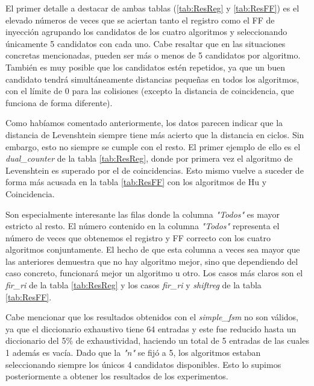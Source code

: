 El primer detalle a destacar de ambas tablas (\ref{tab:ResReg} y \ref{tab:ResFF}) 
es el elevado números de veces que se aciertan tanto el registro como el \gls{FF} 
de inyección agrupando los candidatos de los cuatro algoritmos y seleccionando 
únicamente 5 candidatos con cada uno. Cabe resaltar que en las situaciones 
concretas mencionadas, pueden ser más o menos de 5 candidatos por algoritmo. 
También es muy posible que los candidatos estén repetidos, ya que un buen 
candidato tendrá simultáneamente distancias pequeñas en todos los algoritmos, 
con el límite de 0 para las colisiones (excepto la distancia de coincidencia, 
que funciona de forma diferente).

Como habíamos comentado anteriormente, los datos parecen indicar que la distancia
de Levenshtein siempre tiene más acierto que la distancia en ciclos. Sin embargo,
esto no siempre se cumple con el resto. El primer ejemplo de ello es el
\textit{dual\_counter} de la tabla \ref{tab:ResReg}, donde por primera vez el
algoritmo de Levenshtein es superado por el de coincidencias. Esto mismo vuelve a
suceder de forma más acusada en la tabla \ref{tab:ResFF} con los algoritmos de Hu
y Coincidencia.

Son especialmente interesante las filas donde la columna \textit{"Todos"} es
mayor estricto al resto. El número contenido en la columna \textit{"Todos"}
representa el número de veces que obtenemos el registro y \gls{FF} correcto con
los cuatro algoritmos conjuntamente. El hecho de que esta columna a veces sea 
mayor que las anteriores demuestra que no hay algoritmo mejor, sino que
dependiendo del caso concreto, funcionará mejor un algoritmo u otro. Los casos más
claros son el \textit{fir\_ri} de la tabla \ref{tab:ResReg} y los casos
\textit{fir\_ri} y \textit{shiftreg}  de la tabla \ref{tab:ResFF}.

Cabe mencionar que los resultados obtenidos con el \textit{simple\_fsm} no son
válidos, ya que el diccionario exhaustivo tiene 64 entradas y este fue reducido
hasta un diccionario del 5\% de exhaustividad, haciendo un total de 5 entradas de
las cuales 1 además es vacía. Dado que la \textit{"n"} se fijó a 5, los algoritmos
estaban seleccionando siempre los únicos 4 candidatos disponibles. Esto lo supimos
posteriormente a obtener los resultados de los experimentos.

